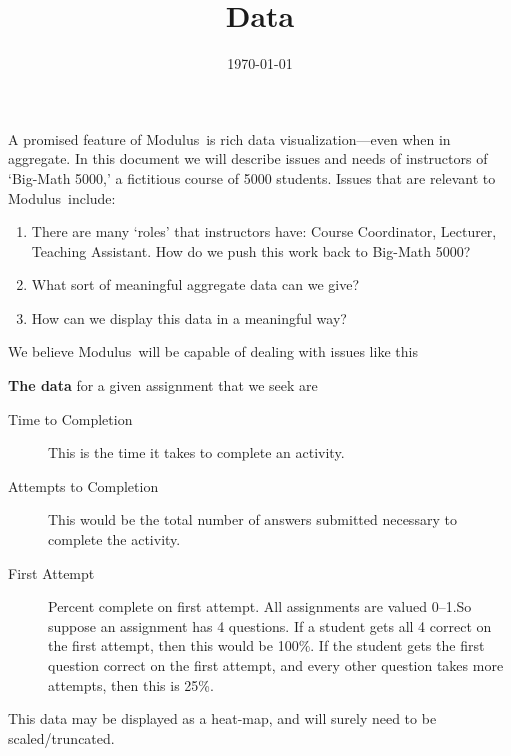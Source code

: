 \documentclass{techbrief}
\title{Data}
\date{\today}
\newcommand{\modulus}{\textsf{Modulus}}
\begin{document}
\pagestyle{main}%
\thispagestyle{title}
\noindent
\lettrine[lines=2]{A}{} promised feature of \modulus\ is rich data visualization---even when in
aggregate.
In this document we will describe issues and needs of instructors of `Big-Math
5000,' a fictitious course of 5000 students.
Issues that are relevant to \modulus\ include:
\begin{enumerate}
    \item There are many `roles' that instructors have: Course Coordinator,
          Lecturer, Teaching Assistant. How do we push this work back to
          Big-Math 5000?
    \item What sort of meaningful aggregate data can we give?
    \item How can we display this data in a meaningful way?
\end{enumerate}
We believe \modulus\ will be capable of dealing with issues like this

\begin{xframe}
    \textbf{The data} for a given assignment that we seek are 
    \begin{description}
        \item[Time to Completion] This is the time it takes to complete an
            activity.
        \item[Attempts to Completion] This would be the total number of answers
            submitted necessary to complete the activity.
        \item[First Attempt] Percent complete on first
            attempt. All assignments are valued
            0--1.So suppose an assignment has 4 questions. If a student gets
            all 4 correct on the first attempt, then this would be 100\%. If
            the
            student gets
            the first question correct on the first attempt, and every other
            question takes
            more attempts, then this is 25\%.
    \end{description}
    This data may be displayed as a heat-map, and will surely need to be
    scaled/truncated.
\end{xframe}
\end{document}
